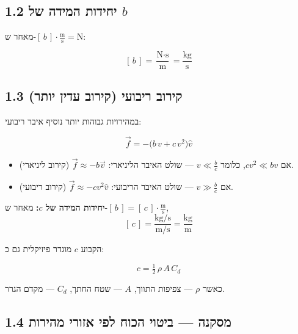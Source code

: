 \documentclass[12pt, a4paper]{article}
\newcommand{\hvec}[1]{\overrightarrow{#1}}
\begin{document}
\subsection*{1.2 יחידות המידה של \textenglish{$b$}}

מאחר ש-\textenglish{$[\,b\,]\cdot\frac{\text{m}}{\text{s}} = \text{N}$}:

\begin{tcolorbox}[resultbox]
\[
  [\,b\,] = \frac{\text{N}\cdot\text{s}}{\text{m}} = \frac{\text{kg}}{\text{s}}
\]
\end{tcolorbox}

\subsection*{1.3 קירוב ריבועי (קירוב עדין יותר)}

במהירויות גבוהות יותר נוסיף איבר ריבועי:

\begin{tcolorbox}[resultbox]
\[
  \hvec{f} = -\bigl(b\,v + c\,v^2\bigr)\hat{v}
\]
\end{tcolorbox}

\begin{tcolorbox}[notebox, title={אזורי תקפות}]
\begin{itemize}
  \item אם \textenglish{$c v^2 \ll b v$}, כלומר \textenglish{$v \ll \tfrac{b}{c}$} --- שולט האיבר הליניארי:
        \textenglish{$\hvec{f} \approx -b\hvec{v}$} (קירוב ליניארי).
  \item אם \textenglish{$v \gg \tfrac{b}{c}$} --- שולט האיבר הריבועי:
        \textenglish{$\hvec{f} \approx -c v^2\hat{v}$} (קירוב ריבועי).
\end{itemize}
\end{tcolorbox}

\textbf{יחידות המידה של \textenglish{$c$}:} מאחר ש-\textenglish{$[\,b\,] = [\,c\,]\cdot\frac{\text{m}}{\text{s}}$},
\[
  [\,c\,] = \frac{\text{kg}/\text{s}}{\text{m}/\text{s}} = \frac{\text{kg}}{\text{m}}
\]

הקבוע \textenglish{$c$} מוגדר פיזיקלית גם כ:
\begin{tcolorbox}[resultbox]
\[
  c = \tfrac{1}{2}\,\rho\,A\,C_d
\]
\end{tcolorbox}
כאשר \textenglish{$\rho$} --- צפיפות התווך, \textenglish{$A$} --- שטח החתך, \textenglish{$C_d$} --- מקדם הגרר.

\subsection*{1.4 מסקנה --- ביטוי הכוח לפי אזורי מהירות}
\end{document}
